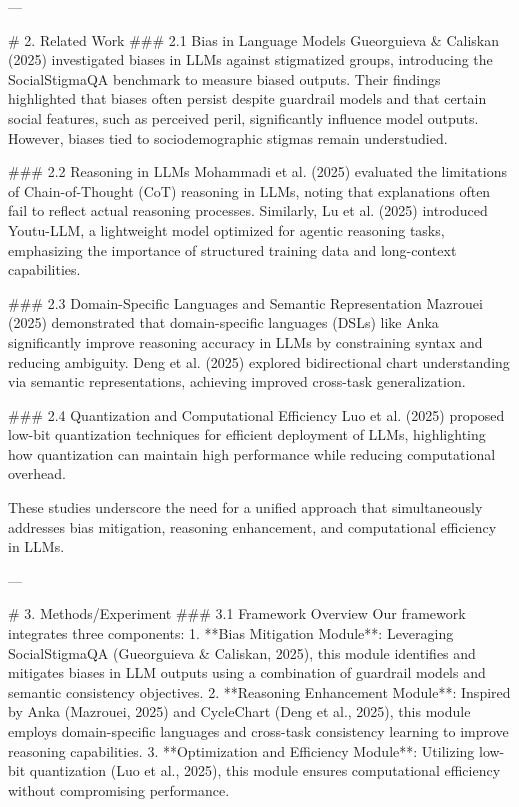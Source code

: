 ---

# 2. Related Work
### 2.1 Bias in Language Models
Gueorguieva & Caliskan (2025) investigated biases in LLMs against stigmatized groups, introducing the SocialStigmaQA benchmark to measure biased outputs. Their findings highlighted that biases often persist despite guardrail models and that certain social features, such as perceived peril, significantly influence model outputs. However, biases tied to sociodemographic stigmas remain understudied.

### 2.2 Reasoning in LLMs
Mohammadi et al. (2025) evaluated the limitations of Chain-of-Thought (CoT) reasoning in LLMs, noting that explanations often fail to reflect actual reasoning processes. Similarly, Lu et al. (2025) introduced Youtu-LLM, a lightweight model optimized for agentic reasoning tasks, emphasizing the importance of structured training data and long-context capabilities.

### 2.3 Domain-Specific Languages and Semantic Representation
Mazrouei (2025) demonstrated that domain-specific languages (DSLs) like Anka significantly improve reasoning accuracy in LLMs by constraining syntax and reducing ambiguity. Deng et al. (2025) explored bidirectional chart understanding via semantic representations, achieving improved cross-task generalization.

### 2.4 Quantization and Computational Efficiency
Luo et al. (2025) proposed low-bit quantization techniques for efficient deployment of LLMs, highlighting how quantization can maintain high performance while reducing computational overhead.

These studies underscore the need for a unified approach that simultaneously addresses bias mitigation, reasoning enhancement, and computational efficiency in LLMs.

---

# 3. Methods/Experiment
### 3.1 Framework Overview
Our framework integrates three components:
1. **Bias Mitigation Module**: Leveraging SocialStigmaQA (Gueorguieva & Caliskan, 2025), this module identifies and mitigates biases in LLM outputs using a combination of guardrail models and semantic consistency objectives.
2. **Reasoning Enhancement Module**: Inspired by Anka (Mazrouei, 2025) and CycleChart (Deng et al., 2025), this module employs domain-specific languages and cross-task consistency learning to improve reasoning capabilities.
3. **Optimization and Efficiency Module**: Utilizing low-bit quantization (Luo et al., 2025), this module ensures computational efficiency without compromising performance.

